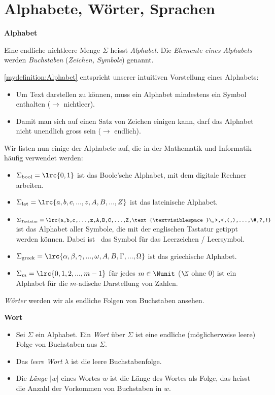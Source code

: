 \section{Alphabete, Wörter, Sprachen}
\begin{mydefinition}{\textbf{Alphabet}}\label{mydefinition:Alphabet}

Eine endliche nichtleere Menge $\Sigma$ heisst \textit{Alphabet}. Die \textit{Elemente eines Alphabets} werden \textit{Buchstaben} (\textit{Zeichen, Symbole}) genannt.
\end{mydefinition}
\cref{mydefinition:Alphabet} entspricht unserer intuitiven Vorstellung eines Alphabets:
\begin{itemize}
	\item Um Text darstellen zu können, muss ein Alphabet mindestens ein Symbol enthalten ($\to$ nichtleer).
	\item Damit man sich auf einen Satz von Zeichen einigen kann, darf das Alphabet nicht unendlich gross sein ($\to$ endlich).
\end{itemize}

Wir listen nun einige der Alphabete auf, die in der Mathematik und Informatik häufig verwendet werden:
\begin{itemize}
	\item $\Sigma_{\text{bool}} = \lrc{0,1}$ ist das Boole'sche Alphabet, mit dem digitale Rechner arbeiten.
	\item $\Sigma_{\text{lat}} = \lrc{a,b,c,...,z,A,B,...,Z}$ ist das lateinische Alphabet.
	\item $\Sigma_{\text{Tastatur}} = \lrc{a,b,c,...,z,A,B,C,...,Z,\text{\textvisiblespace}\,,>,<,(,),...,\#,?,!}$ ist das Alphabet aller Symbole, die mit der englischen Tastatur getippt werden können. Dabei ist \textvisiblespace\ das Symbol für das Leerzeichen / Leersymbol.
	\item $\Sigma_{\text{greek}} = \lrc{\alpha, \beta, \gamma, ..., \omega, A, B, \Gamma, ..., \Omega}$ ist das griechische Alphabet.
	\item $\Sigma_m = \lrc{0,1,2,...,m-1}$ für jedes $m\in\Nunit$ ($\N$ ohne $0$) ist ein Alphabet für die $m$-adische Darstellung von Zahlen.
\end{itemize}
\textit{Wörter} werden wir als endliche Folgen von Buchstaben ansehen.
\begin{mydefinition}{\textbf{Wort}}\label{mydefinition:Wort}
\begin{itemize}
	\item Sei $\Sigma$ ein Alphabet. Ein \textit{Wort} über $\Sigma$ ist eine endliche (möglicherweise leere) Folge von Buchstaben aus $\Sigma$.
	\item Das \textit{leere Wort} $\lambda$ ist die leere Buchstabenfolge.
	\item Die \textit{Länge} $|w|$ eines Wortes $w$ ist die Länge des Wortes als Folge, das heisst die Anzahl der Vorkommen von Buchstaben in $w$.
\end{itemize}
\end{mydefinition}

